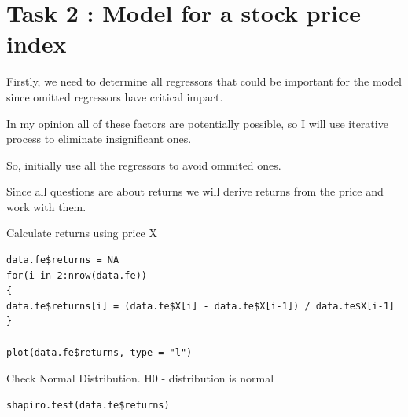 \documentclass[12pt,a4paper]{article}
\begin{document}
\section{Task 2 : Model for a stock price index}
Firstly, we need to determine all regressors that could be important for the model since omitted regressors have critical impact.

In my opinion all of these factors are potentially possible, so I will use iterative process to eliminate insignificant ones.

So, initially use all the regressors to avoid ommited ones.

Since all questions are about returns we will derive returns from the price and work with them.

Calculate returns using price X

\begin{verbatim}
data.fe$returns = NA
for(i in 2:nrow(data.fe))
{
data.fe$returns[i] = (data.fe$X[i] - data.fe$X[i-1]) / data.fe$X[i-1]
}

plot(data.fe$returns, type = "l")
\end{verbatim}
\begin{center}
\end{center}
Check Normal Distribution. H0 - distribution is normal
\begin{verbatim}
shapiro.test(data.fe$returns)
\end{verbatim}
\begin{center}
\end{center}
\end{document}
